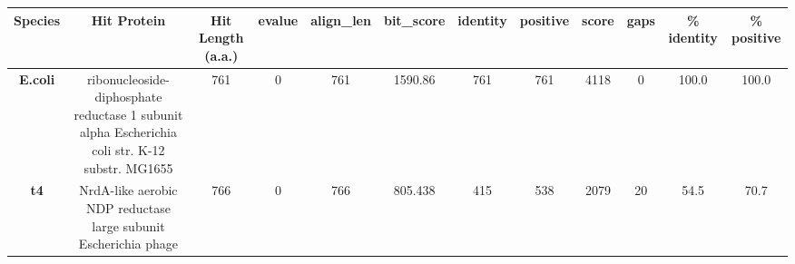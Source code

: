 \begin{tabular}{|c|c|c|c|c|c|c|c|c|c|c|c|} \hline
\textbf{Species} & \textbf{Hit Protein} & \textbf{Hit Length (a.a.)} & \textbf{evalue} & \textbf{align\_len} & \textbf{bit\_score} & \textbf{identity} & \textbf{positive} & \textbf{score} & \textbf{gaps} & \textbf{\% identity} & \textbf{\% positive} \\ \hline
\textbf{E.coli} & ribonucleoside-diphosphate reductase 1 subunit alpha Escherichia coli str. K-12 substr. MG1655 & 761 & 0 & 761 & 1590.86 & 761 & 761 & 4118 & 0 & 100.0 & 100.0\\
\textbf{t4} & NrdA-like aerobic NDP reductase large subunit Escherichia phage  & 766 & 0 & 766 & 805.438 & 415 & 538 & 2079 & 20 & 54.5 & 70.7\\
\hline \end{tabular}
